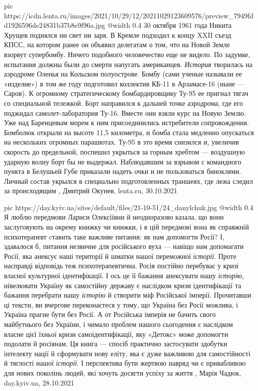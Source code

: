 \ifcmt
  pic https://icdn.lenta.ru/images/2021/10/29/12/20211029123609576/preview_7949fdd1926596de24831b37b8e9f96a.jpg
  @width 0.4
\fi
30 октября 1961 года Никита Хрущев поднялся ни свет ни заря. В Кремле подходил
к концу XXII съезд КПСС, на котором ранее он объявил делегатам о том, что на
Новой Земле взорвут супербомбу. Ничего подобного человечество еще не видело. По
задумке, испытания должны были до смерти напугать американцев.  \emph{История}
творилась на аэродроме Оленья на Кольском полуострове. Бомбу (сами ученые
называли ее «изделие») в том же году подготовил коллектив КБ-11 в Арзамасе-16
(ныне — Саров). К огромному стратегическому бомбардировщику Ту-95 ее пригнал
тягач со специальной тележкой. Борт направился к дальней точке аэродрома, где
его поджидал самолет-лаборатория Ту-16. Вместе они взяли курс на Новую Землю.
Уже над Баренцевым морем к ним присоединились истребители сопровождения.
Бомболюк открыли на высоте 11,5 километра, и бомба стала медленно опускаться на
нескольких огромных парашютах. Ту-95 в это время снизился и, увеличив скорость
до предельной, поспешил укрыться за горным хребтом — воздушную ударную волну
борт бы не выдержал. Наблюдавшим за взрывом с командного пункта в Белушьей Губе
приказали надеть очки и не пользоваться биноклями. Личный состав укрылся в
специально подготовленных траншеях, где лежа следил за происходящим
, Дмитрий Окунев, lenta.ru, 30.10.2021

\ifcmt
  pic https://day.kyiv.ua/sites/default/files/21-10-51/24_danylchuk.jpg
  @width 0.4
\fi
Я люблю передмови Лариси Олексіївни й неодноразово казала, що вони заслуговують
на окрему книжку чи книжки, і в цій передмові вона як справжній психотерапевт
cтавить таке важливе питання: як нам допомогти Росії? І, здавалося б, питання
незвичне для російського вуха — навіщо нам допомагати Росії, яка анексує наші
території й шматки нашої переможної \emph{історії}. Проте насправді відповідь
теж психотерапевтична. Росія постійно перебуває у кризі власної культурної
ідентифікації. І ось це її бажання анексувати нашу \emph{історію}, нівелювати
Україну як самостійну державу є наслідком кризи ідентифікації та бажання
перебрати нашу \emph{історію} й створити міф Російської імперії.  Прочитавши ці
тексти, ви вчергове переконаєтеся у тому, що Україна без Росії можлива, і
Україна прагне бути без Росії. А от Російська імперія не бачить свого
майбутнього без України, і чимало проблем нашого сьогодення є наслідком власне
цієї їхньої кризи самоідентифікації, яку «Детокс» може допомогти подолати й
росіянам. Ця книга — спосіб практично застосувати здобутки інтелекту нації й
сформувати нову еліту, яка є дуже важливою для самостійності й тяглості нашої
\emph{історії}. І перспектива бути жертвою навряд чи є привабливою для нових поколінь
людей, які хочуть досягти успіху за життя
, 
Марія Чадюк, day.kyiv.ua, 28.10.2021

